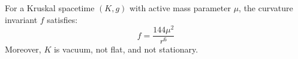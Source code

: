 For a Kruskal spacetime $(K,g)$ with active mass parameter $\mu$, the curvature invariant $f$ satisfies:
$$f = \frac{144\mu^2}{r^6}$$
Moreover, $K$ is vacuum, not flat, and not stationary.

